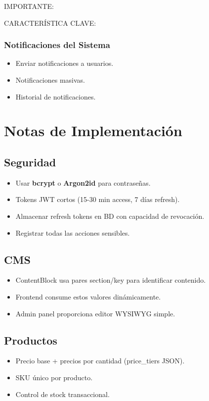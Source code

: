 \documentclass[12pt,a4paper,oneside]{book}
\begin{document}
\begin{alert}{IMPORTANTE:}
\begin{info}{CARACTERÍSTICA CLAVE:}
\subsection{Notificaciones del Sistema}
\begin{itemize}
    \item Enviar notificaciones a usuarios.
    \item Notificaciones masivas.
    \item Historial de notificaciones.
\end{itemize}

\chapter{Notas de Implementación}
\label{cap:implementacion}

\section{Seguridad}
\begin{itemize}
    \item Usar \textbf{bcrypt} o \textbf{Argon2id} para contraseñas.
    \item Tokens JWT cortos (15-30 min access, 7 días refresh).
    \item Almacenar refresh tokens en BD con capacidad de revocación.
    \item Registrar todas las acciones sensibles.
\end{itemize}

\section{CMS}
\begin{itemize}
    \item ContentBlock usa pares section/key para identificar contenido.
    \item Frontend consume estos valores dinámicamente.
    \item Admin panel proporciona editor WYSIWYG simple.
\end{itemize}

\section{Productos}
\begin{itemize}
    \item Precio base + precios por cantidad (price\_tiers JSON).
    \item SKU único por producto.
    \item Control de stock transaccional.
\end{itemize}


\end{info}
\end{alert}
\end{document}
